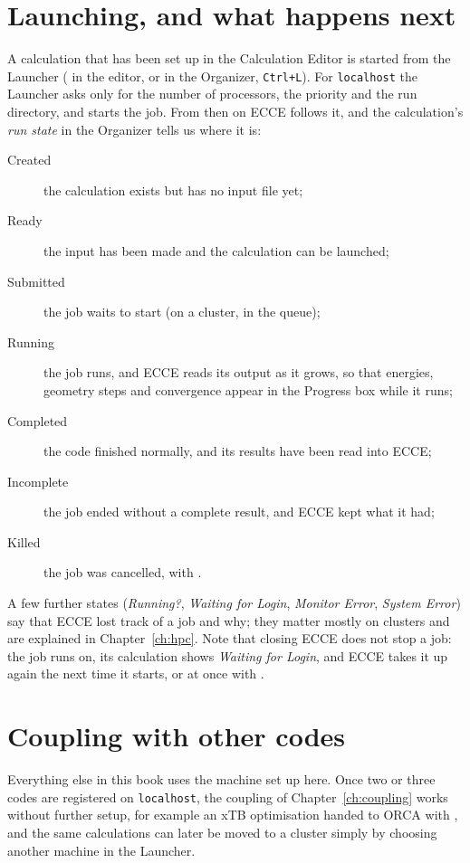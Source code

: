 \section{Launching, and what happens next}
A calculation that has been set up in the Calculation Editor is started from the Launcher ( in the editor, or  in the Organizer, \texttt{Ctrl+L}). For \texttt{localhost} the Launcher asks only for the number of processors, the priority and the run directory, and  starts the job. From then on ECCE follows it, and the calculation's \emph{run state} in the Organizer tells us where it is:
\begin{description}
	\item[Created] the calculation exists but has no input file yet;
	\item[Ready] the input has been made and the calculation can be launched;
	\item[Submitted] the job waits to start (on a cluster, in the queue);
	\item[Running] the job runs, and ECCE reads its output as it grows, so that energies, geometry steps and convergence appear in the Progress box while it runs;
	\item[Completed] the code finished normally, and its results have been read into ECCE;
	\item[Incomplete] the job ended without a complete result, and ECCE kept what it had;
	\item[Killed] the job was cancelled, with .
\end{description}
A few further states (\emph{Running?}, \emph{Waiting for Login}, \emph{Monitor Error}, \emph{System Error}) say that ECCE lost track of a job and why; they matter mostly on clusters and are explained in Chapter~\ref{ch:hpc}. Note that closing ECCE does not stop a job: the job runs on, its calculation shows \emph{Waiting for Login}, and ECCE takes it up again the next time it starts, or at once with .

\section{Coupling with other codes}
Everything else in this book uses the machine set up here. Once two or three codes are registered on \texttt{localhost}, the coupling of Chapter~\ref{ch:coupling} works without further setup, for example an xTB optimisation handed to ORCA with , and the same calculations can later be moved to a cluster simply by choosing another machine in the Launcher.
